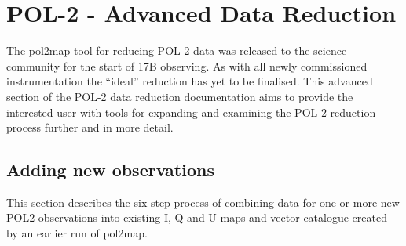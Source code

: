 \chapter{POL-2 - Advanced Data Reduction}
\label{sec:advanced}


The pol2map tool for reducing POL-2 data was released to the science
community for the start of 17B observing. As with all newly
commissioned instrumentation the ``ideal'' reduction has yet to be
finalised. This advanced section of the POL-2 data reduction
documentation aims to provide the interested user with tools for
expanding and examining the POL-2 reduction process further and in
more detail.


\section{Adding new observations}

This section describes the six-step process of combining data for one
or more new POL2 observations into existing I, Q and U maps and vector
catalogue created by an earlier run of pol2map.

